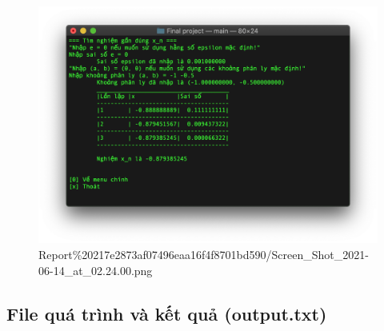 \begin{figure}[htbp]
\centering
\includegraphics{Report 217e2873af07496eaa16f4f8701bd590/Screen_Shot_2021-06-14_at_02.24.00.png}
\caption{Report\%20217e2873af07496eaa16f4f8701bd590/Screen\_Shot\_2021-06-14\_at\_02.24.00.png}
\end{figure}

\subsection{File quá trình và kết quả
(output.txt)}\label{file-quuxe1-truxecnh-vuxe0-kux1ebft-quux1ea3-output.txt}

